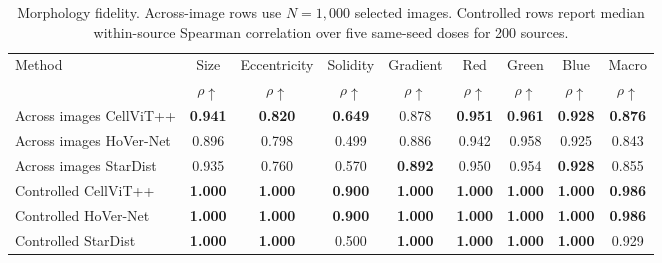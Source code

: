 \begin{table}[t]
\centering
\caption{Morphology fidelity. Across-image rows use $N=1{,}000$ selected images. Controlled rows report median within-source Spearman correlation over five same-seed doses for 200 sources.}
\label{tab:morphology}
\small
\begin{tabular*}{\textwidth}{@{\extracolsep{\fill}}lcccccccc@{}}
\toprule
Method
& Size
& Eccentricity
& Solidity
& Gradient
& Red
& Green
& Blue
& Macro \\
& $\rho\uparrow$
& $\rho\uparrow$
& $\rho\uparrow$
& $\rho\uparrow$
& $\rho\uparrow$
& $\rho\uparrow$
& $\rho\uparrow$
& $\rho\uparrow$ \\
\midrule
Across images CellViT++
& \textbf{0.941}
& \textbf{0.820}
& \textbf{0.649}
& 0.878
& \textbf{0.951}
& \textbf{0.961}
& \textbf{0.928}
& \textbf{0.876} \\
Across images HoVer-Net
& 0.896
& 0.798
& 0.499
& 0.886
& 0.942
& 0.958
& 0.925
& 0.843 \\
Across images StarDist
& 0.935
& 0.760
& 0.570
& \textbf{0.892}
& 0.950
& 0.954
& \textbf{0.928}
& 0.855 \\
\midrule
Controlled CellViT++
& \textbf{1.000}
& \textbf{1.000}
& \textbf{0.900}
& \textbf{1.000}
& \textbf{1.000}
& \textbf{1.000}
& \textbf{1.000}
& \textbf{0.986} \\
Controlled HoVer-Net
& \textbf{1.000}
& \textbf{1.000}
& \textbf{0.900}
& \textbf{1.000}
& \textbf{1.000}
& \textbf{1.000}
& \textbf{1.000}
& \textbf{0.986} \\
Controlled StarDist
& \textbf{1.000}
& \textbf{1.000}
& 0.500
& \textbf{1.000}
& \textbf{1.000}
& \textbf{1.000}
& \textbf{1.000}
& 0.929 \\
\bottomrule
\end{tabular*}
\end{table}

